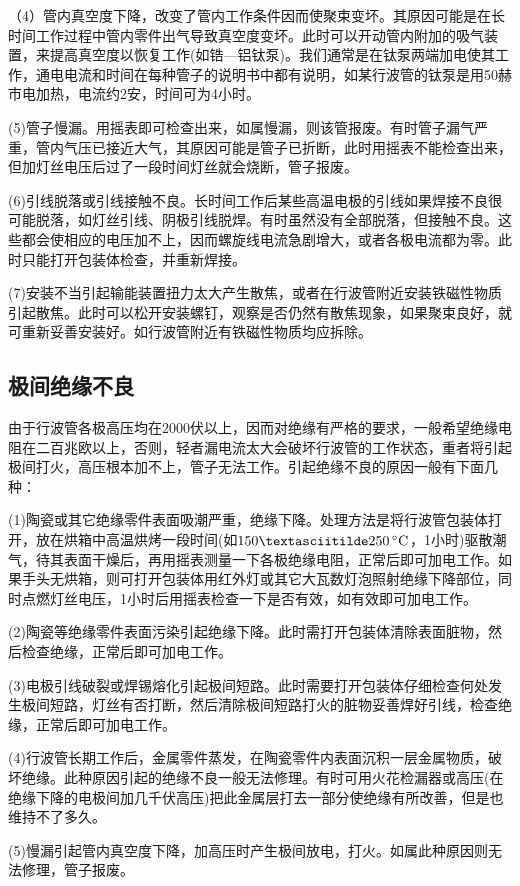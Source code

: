 （4）管内真空度下降，改变了管内工作条件因而使聚束变坏。其原因可能是在长时间工作过程中管内零件出气导致真空度变坏。此时可以开动管内附加的吸气装置，来提高真空度以恢复工作(如锆—铝钛泵)。我们通常是在钛泵两端加电使其工作，通电电流和时间在每种管子的说明书中都有说明，如某行波管的钛泵是用50赫市电加热，电流约2安，时间可为4小时。


(5)管子慢漏。用摇表即可检查出来，如属慢漏，则该管报废。有时管子漏气严重，管内气压已接近大气，其原因可能是管子已折断，此时用摇表不能检查出来，但加灯丝电压后过了一段时间灯丝就会烧断，管子报废。

(6)引线脱落或引线接触不良。长时间工作后某些高温电极的引线如果焊接不良很可能脱落，如灯丝引线、阴极引线脱焊。有时虽然没有全部脱落，但接触不良。这些都会使相应的电压加不上，因而螺旋线电流急剧增大，或者各极电流都为零。此时只能打开包装体检查，并重新焊接。

(7)安装不当引起输能装置扭力太大产生散焦，或者在行波管附近安装铁磁性物质引起散焦。此时可以松开安装螺钉，观察是否仍然有散焦现象，如果聚束良好，就可重新妥善安装好。如行波管附近有铁磁性物质均应拆除。
\subsection{极间绝缘不良}
由于行波管各极高压均在2000伏以上，因而对绝缘有严格的要求，一般希望绝缘电阻在二百兆欧以上，否则，轻者漏电流太大会破坏行波管的工作状态，重者将引起极间打火，高压根本加不上，管子无法工作。引起绝缘不良的原因一般有下面几种：

(1)陶瓷或其它绝缘零件表面吸潮严重，绝缘下降。处理方法是将行波管包装体打开，放在烘箱中高温烘烤一段时间(如$ 150\textasciitilde250\,\si{\degreeCelsius} $，1小时)驱散潮气，待其表面干燥后，再用摇表测量一下各极绝缘电阻，正常后即可加电工作。如果手头无烘箱，则可打开包装体用红外灯或其它大瓦数灯泡照射绝缘下降部位，同时点燃灯丝电压，1小时后用摇表检查一下是否有效，如有效即可加电工作。

(2)陶瓷等绝缘零件表面污染引起绝缘下降。此时需打开包装体清除表面脏物，然后检查绝缘，正常后即可加电工作。

(3)电极引线破裂或焊锡熔化引起极间短路。此时需要打开包装体仔细检查何处发生极间短路，灯丝有否打断，然后清除极间短路打火的脏物妥善焊好引线，检查绝缘，正常后即可加电工作。

(4)行波管长期工作后，金属零件蒸发，在陶瓷零件内表面沉积一层金属物质，破坏绝缘。此种原因引起的绝缘不良一般无法修理。有时可用火花检漏器或高压(在绝缘下降的电极间加几千伏高压)把此金属层打去一部分使绝缘有所改善，但是也维持不了多久。

(5)慢漏引起管内真空度下降，加高压时产生极间放电，打火。如属此种原因则无法修理，管子报废。
